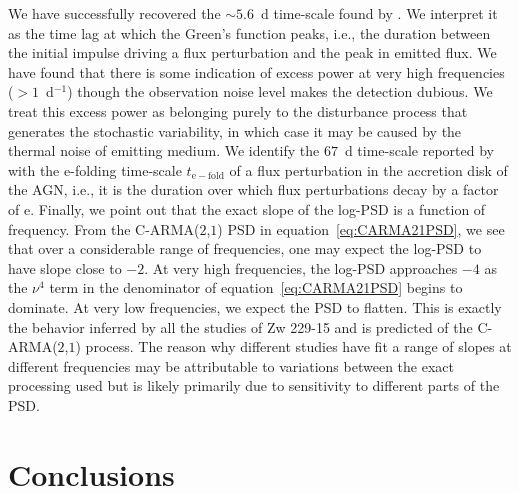 \documentclass[a4paper,fleqn,usenatbib]{mnras}
\begin{document}
We have successfully recovered the $\sim 5.6$~d time-scale found by \citet{Edelson14}. We interpret it as the time lag at which the Green's function peaks, i.e., the duration between the initial impulse driving a flux perturbation and the peak in emitted flux. We have found that there is some indication of excess power at very high frequencies ($> 1$~d$^{-1}$) though the observation noise level makes the detection dubious. We treat this excess power as belonging purely to the disturbance process that generates the stochastic variability, in which case it may be caused by the thermal noise of emitting medium. We identify the $67$~d time-scale reported by \citet{CariniWilliamsAAS} with the e-folding time-scale $t_{\mathrm{e-fold}}$ of a flux perturbation in the accretion disk of the AGN, i.e., it is the duration over which flux perturbations decay by a factor of $\mathrm{e}$. Finally, we point out that the exact slope of the log-PSD is a function of frequency. From the C-ARMA($2$,$1$) PSD in equation~\eqref{eq:CARMA21PSD}, we see that over a considerable range of frequencies, one may expect the log-PSD to have slope close to $-2$. At very high frequencies, the log-PSD approaches $-4$ as the $\nu^{4}$ term in the denominator of equation~\eqref{eq:CARMA21PSD} begins to dominate. At very low frequencies, we expect the PSD to flatten. This is exactly the behavior inferred by all the studies of Zw 229-15 and is predicted of the C-ARMA($2$,$1$) process. The reason why different studies have fit a range of slopes at different frequencies may be attributable to variations between the exact processing used but is likely primarily due to sensitivity to different parts of the PSD.



\section[Conclusion]{Conclusions}\label{sec:Conclusions}
\end{document}
